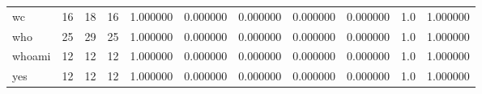 \begin{tabular}{lrrrrrrrrrr}
wc        &                                      16 &                 18 &                                16 &                                   1.000000 &                               0.000000 &                                     0.000000 &                          0.000000 &                                0.000000 &                                1.0 &                                           1.000000 \\
who       &                                      25 &                 29 &                                25 &                                   1.000000 &                               0.000000 &                                     0.000000 &                          0.000000 &                                0.000000 &                                1.0 &                                           1.000000 \\
whoami    &                                      12 &                 12 &                                12 &                                   1.000000 &                               0.000000 &                                     0.000000 &                          0.000000 &                                0.000000 &                                1.0 &                                           1.000000 \\
yes       &                                      12 &                 12 &                                12 &                                   1.000000 &                               0.000000 &                                     0.000000 &                          0.000000 &                                0.000000 &                                1.0 &                                           1.000000 \\
\bottomrule
\end{tabular}

